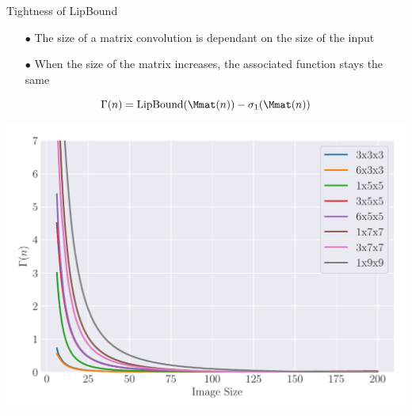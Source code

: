 \begin{frame}{Tightness of LipBound}

  {\small
  \begin{itemize}
    \item[$\bullet$] The size of a matrix convolution is dependant on the size of the input
    \item[$\bullet$] When the size of the matrix increases, the associated function stays the same
  \end{itemize}
  }
  \vspace{-0.2cm}
  \begin{equation}
    \Gamma(n) = \lipbound(\Mmat(n)) - \sigma_1(\Mmat(n))
  \end{equation}
  \begin{minipage}{\textwidth}
    \centering
    \includegraphics[scale=0.48]{images/convergence_bounds.pdf}
  \end{minipage}

\end{frame}


